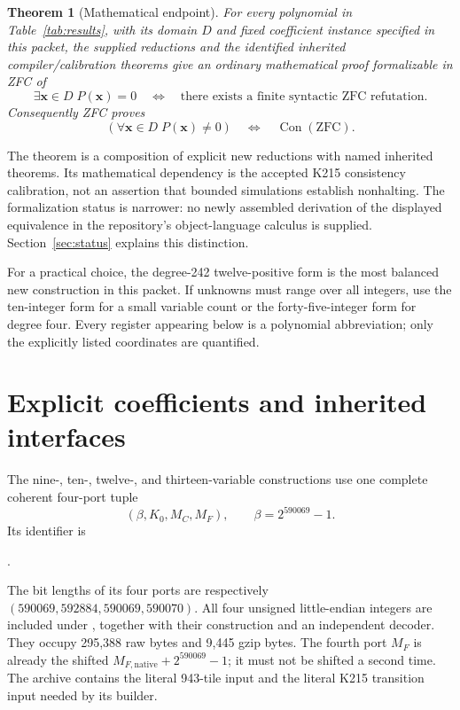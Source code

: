 \documentclass[11pt,a4paper]{article}
\newcommand{\Con}{\operatorname{Con}(\mathrm{ZFC})}
\newtheorem{theorem}{Theorem}[section]
\theoremstyle{definition}
\begin{document}
\begin{theorem}[Mathematical endpoint]
For every polynomial in Table~\ref{tab:results}, with its domain \(D\)
and fixed coefficient instance specified in this packet, the supplied
reductions and the identified inherited compiler/calibration theorems give
an ordinary mathematical proof formalizable in ZFC of
\[
  \exists\mathbf x\in D\;P(\mathbf x)=0
  \quad\Longleftrightarrow\quad
  \text{there exists a finite syntactic ZFC refutation}.
\]
Consequently ZFC proves
\[
 \boxed{\quad
 (\forall\mathbf x\in D\;P(\mathbf x)\ne0)
 \quad\Longleftrightarrow\quad\Con.
 \quad}
\]
\end{theorem}

The theorem is a composition of explicit new reductions with named inherited
theorems.  Its mathematical dependency is the accepted K215 consistency
calibration, not an assertion that bounded simulations establish nonhalting.
The formalization status is narrower: no newly assembled derivation of
the displayed equivalence in the repository's object-language 
calculus is supplied.  Section~\ref{sec:status} explains this distinction.

For a practical choice, the degree-242 twelve-positive form is the most
balanced new construction in this packet.  If unknowns must range over all
integers, use the ten-integer form for a small variable count or the
forty-five-integer form for degree four.  Every register appearing below
is a polynomial abbreviation; only the explicitly listed coordinates
are quantified.

\section{Explicit coefficients and inherited interfaces}
\label{sec:coefficients}

The nine-, ten-, twelve-, and thirteen-variable constructions use one
complete coherent four-port tuple
\[
  (\beta,K_0,M_C,M_F),\qquad \beta=2^{590069}-1.
\]
Its identifier is
\begin{center}\small
{}.
\end{center}
The bit lengths of its four ports are respectively
\((590069,592884,590069,590070)\).  All four unsigned little-endian
integers are included under , together
with their construction and an independent decoder.  They occupy 295,388
raw bytes and 9,445 gzip bytes.  The fourth port \(M_F\) is already the
shifted \(M_{F,\mathrm{native}}+2^{590069}-1\); it must not be shifted
a second time.  The archive contains the literal 943-tile input and the
literal K215 transition input needed by its builder.
\end{document}
